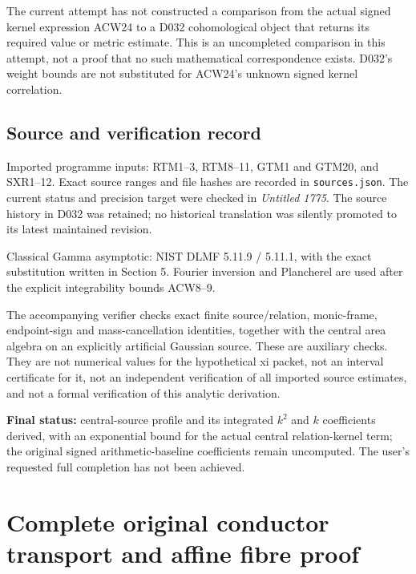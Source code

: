 \documentclass[11pt,a4paper]{article}
\begin{document}
The current attempt has not constructed a comparison from the actual signed kernel expression ACW24 to a D032 cohomological object that returns its required value or metric estimate. This is an uncompleted comparison in this attempt, not a proof that no such mathematical correspondence exists. D032's weight bounds are not substituted for ACW24's unknown signed kernel correlation.

\subsection{Source and verification record}\label{acw:source-and-verification-record}

Imported programme inputs: RTM1--3, RTM8--11, GTM1 and GTM20, and SXR1--12. Exact source ranges and file hashes are recorded in \texttt{sources.json}. The current status and precision target were checked in \emph{Untitled 1775}. The source history in D032 was retained; no historical translation was silently promoted to its latest maintained revision.

Classical Gamma asymptotic: NIST DLMF 5.11.9 / 5.11.1, with the exact substitution written in Section 5. Fourier inversion and Plancherel are used after the explicit integrability bounds ACW8--9.

The accompanying verifier checks exact finite source/relation, monic-frame, endpoint-sign and mass-cancellation identities, together with the central area algebra on an explicitly artificial Gaussian source. These are auxiliary checks. They are not numerical values for the hypothetical xi packet, not an interval certificate for it, not an independent verification of all imported source estimates, and not a formal verification of this analytic derivation.

\textbf{Final status:} central-source profile and its integrated \(k^2\) and \(k\) coefficients derived, with an exponential bound for the actual central relation-kernel term; the original signed arithmetic-baseline coefficients remain uncomputed. The user's requested full completion has not been achieved.

\endgroup

\clearpage
\begingroup


\setcounter{equation}{0}
\renewcommand{\theequation}{LRC.\arabic{equation}}
\section*{Complete original conductor transport and affine fibre proof}
\begingroup
\end{document}
